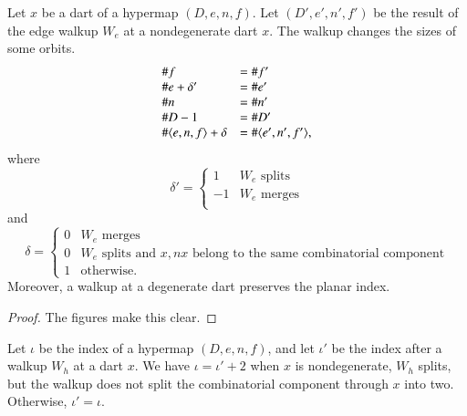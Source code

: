 \begin{lemma} Let $x$ be a dart of a hypermap $(D,e,n,f)$. Let $(D',e',n',f')$ be the result of the edge walkup $W_e$ at
a nondegenerate dart $x$.  
The walkup changes the sizes of some orbits.
    $$
    \begin{array}{lll}
    \# f &= \# f'\\  
    \# e + \delta' &= \# e'\\
    \# n &= \# n'\\
    \# D - 1&= \# D' \\
    \# \langle e,n,f\rangle + \delta&= \#\langle e',n',f'\rangle,\\
    \end{array}
    $$
where
   $$
   \delta' = \begin{cases}
     1 & W_e \text{ splits }\\
    -1 & W_e \text{ merges}\\
   \end{cases}
   $$
and
   $$
   \delta = \begin{cases}
    0 & W_e \text{ merges }\\
    0 & W_e \text{ splits and } x,nx 
      \text{ belong to the same combinatorial component}\\
    1 & \text{otherwise}.
     \end{cases}
   $$
Moreover, a walkup at a degenerate dart preserves the planar index.
\end{lemma}

\begin{proof} The figures make this clear.
\end{proof}

\begin{lemma}
Let $\iota$ be the index of a  hypermap $(D,e,n,f)$, and
let $\iota'$ be the index after a walkup $W_h$
at a dart $x$.  We have $\iota = \iota' + 2$ when
$x$ is nondegenerate, $W_h$ splits, but the walkup does not
split the combinatorial component through $x$ into two.
Otherwise, $\iota'=\iota$.
\end{lemma} 




